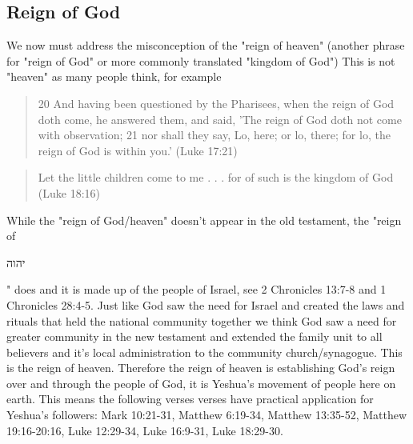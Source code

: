 \documentclass[11pt]{article}
\begin{document}
\subsection{Reign of God} 
We now must address the misconception of the "reign of heaven" (another phrase for "reign of God" or more commonly translated "kingdom of God") This is not "heaven" as many people think, for example 
\begin{quote}
20 And having been questioned by the Pharisees, when the reign of God doth come, he answered them, and said, 'The reign of God doth not come with observation; 21 nor shall they say, Lo, here; or lo, there; for lo, the reign of God is within you.' (Luke 17:21) 
\end{quote}
\begin{quote}
Let the little children come to me . . . for of such is the kingdom of God (Luke 18:16) 
\end{quote}
While the "reign of God/heaven" doesn't appear in the old testament, the "reign of\begin{hebrew} יהוה\end{hebrew}" does and it is made up of the people of Israel, see 2 Chronicles 13:7-8 and 1 Chronicles 28:4-5. Just like God saw the need for Israel and created the laws and rituals that held the national community together we think God saw a need for greater community in the new testament and extended the family unit to all believers and it's local administration to the community church/synagogue. This is the reign of heaven. Therefore the reign of heaven is establishing God's reign over and through the people of God, it is Yeshua's movement of people here on earth. \cite{kh} This means the following verses verses have practical application for Yeshua's followers:  Mark 10:21-31, Matthew 6:19-34, Matthew 13:35-52, Matthew 19:16-20:16, Luke 12:29-34, Luke 16:9-31, Luke 18:29-30. 
\end{document}

